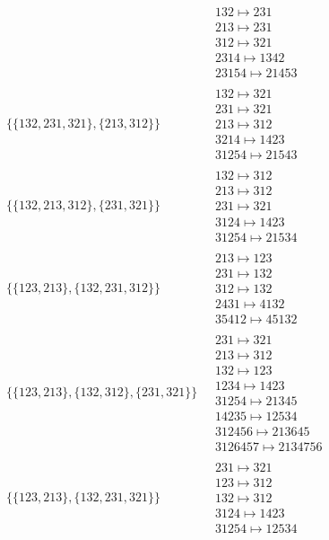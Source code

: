 \begin{scriptsize}
\begin{align}
\ 
&
\begin{matrix}
132 \mapsto 231\\213 \mapsto 231\\312 \mapsto 321\\2314 \mapsto 1342\\23154 \mapsto 21453
\end{matrix}
\\
\{\{132, 231, 321\}, \{213, 312\}\}
\ 
&
\begin{matrix}
132 \mapsto 321\\231 \mapsto 321\\213 \mapsto 312\\3214 \mapsto 1423\\31254 \mapsto 21543
\end{matrix}
\\
\{\{132, 213, 312\}, \{231, 321\}\}
\ 
&
\begin{matrix}
132 \mapsto 312\\213 \mapsto 312\\231 \mapsto 321\\3124 \mapsto 1423\\31254 \mapsto 21534
\end{matrix}
\\
\{\{123, 213\}, \{132, 231, 312\}\}
\ 
&
\begin{matrix}
213 \mapsto 123\\231 \mapsto 132\\312 \mapsto 132\\2431 \mapsto 4132\\35412 \mapsto 45132
\end{matrix}
\\
\{\{123, 213\}, \{132, 312\}, \{231, 321\}\}
\ 
&
\begin{matrix}
231 \mapsto 321\\213 \mapsto 312\\132 \mapsto 123\\1234 \mapsto 1423\\31254 \mapsto 21345\\14235 \mapsto 12534\\312456 \mapsto 213645\\3126457 \mapsto 2134756
\end{matrix}
\\
\{\{123, 213\}, \{132, 231, 321\}\}
\ 
&
\begin{matrix}
231 \mapsto 321\\123 \mapsto 312\\132 \mapsto 312\\3124 \mapsto 1423\\31254 \mapsto 12534

\end{matrix}
\end{align}
\end{scriptsize}
